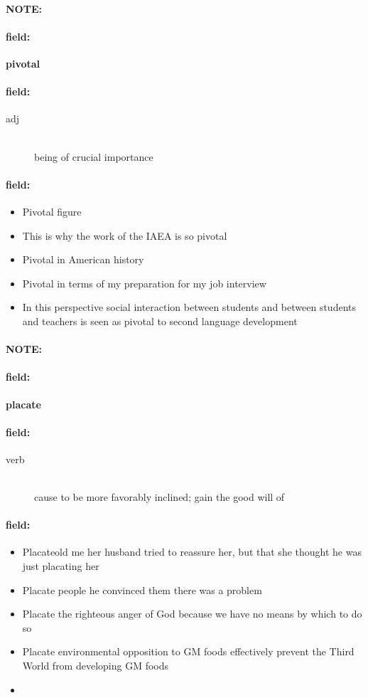 \documentclass[12pt]{article}
\newenvironment{note}{\paragraph{NOTE:}}{}
\newenvironment{field}{\paragraph{field:}}{}
\begin{document}
\begin{note}
\begin{field}
\textbf{\large pivotal}
\end{field}


\begin{field}
\begin{description}
\item[adj] \hfill \\ 
being of crucial importance

\end{description}
\end{field}

\begin{field}
\begin{itemize}
\item Pivotal figure
\item This is why the work of the IAEA is so pivotal
\item Pivotal in American history
\item Pivotal in terms of my preparation for my job interview
\item In this perspective social interaction between students and between students and teachers is seen as pivotal to second language development
\end{itemize}
\end{field}
\end{note}
\begin{note}
\begin{field}
\textbf{\large placate}
\end{field}


\begin{field}
\begin{description}
\item[verb] \hfill \\ 
cause to be more favorably inclined; gain the good will of

\end{description}
\end{field}

\begin{field}
\begin{itemize}
\item Placateold me her husband tried to reassure her, but that she thought he was just placating her
\item Placate people he convinced them there was a problem
\item Placate the righteous anger of God because we have no means by which to do so
\item Placate environmental opposition to GM foods effectively prevent the Third World from developing GM foods
\item 
\end{itemize}
\end{field}
\end{note}
\end{document}
